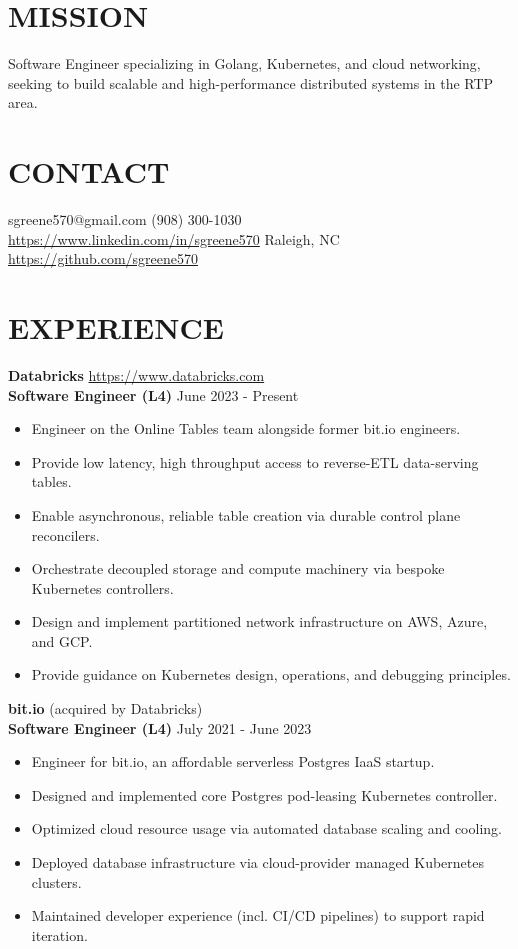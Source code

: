 \documentclass[line, margin, 10.5pt]{res}
\begin{document}

\begin{resume}

\section{\small MISSION}
Software Engineer specializing in Golang, Kubernetes, and cloud networking, seeking to build scalable and high-performance distributed systems in the RTP area.

\section{\small CONTACT}
sgreene570@gmail.com \hfill (908) 300-1030 \\
\url{https://www.linkedin.com/in/sgreene570} \hfill Raleigh, NC \\
\url{https://github.com/sgreene570}

\section{\small EXPERIENCE}
{\bf \large{Databricks}} \hfill \url{https://www.databricks.com} \\
{\bf Software Engineer (L4)} \hfill June 2023 - Present
\begin{itemize}
    \item Engineer on the Online Tables team alongside former bit.io engineers.
    \item Provide low latency, high throughput access to reverse-ETL data-serving tables.
    \item Enable asynchronous, reliable table creation via durable control plane reconcilers.
    \item Orchestrate decoupled storage and compute machinery via bespoke Kubernetes controllers.
    \item Design and implement partitioned network infrastructure on AWS, Azure, and GCP.
    \item Provide guidance on Kubernetes design, operations, and debugging principles.
\end{itemize}

{\bf \large{bit.io}} \hfill (acquired by Databricks) \\
{\bf Software Engineer (L4)} \hfill July 2021 - June 2023
\begin{itemize}
    \item Engineer for bit.io, an affordable serverless Postgres IaaS startup.
    \item Designed and implemented core Postgres pod-leasing Kubernetes controller.
    \item Optimized cloud resource usage via automated database scaling and cooling.
    \item Deployed database infrastructure via cloud-provider managed Kubernetes clusters.
    \item Maintained developer experience (incl. CI/CD pipelines) to support rapid iteration.
\end{itemize}


\end{resume}
\end{document}

